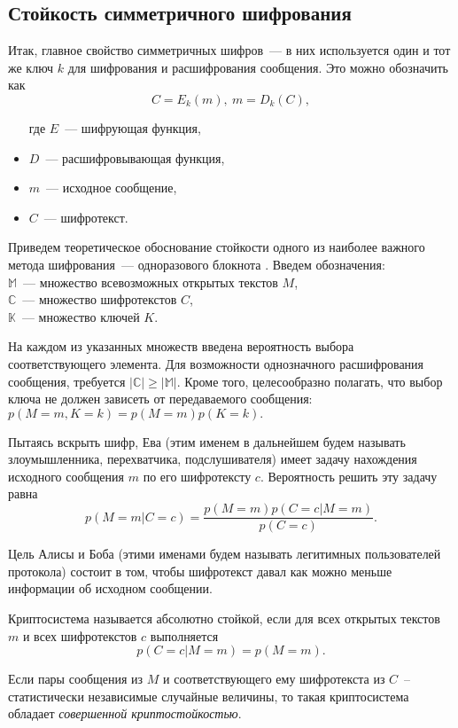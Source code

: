 \subsection{Стойкость симметричного шифрования}
Итак, главное свойство симметричных шифров~--- в них используется один и тот же ключ $k$ для шифрования и расшифрования сообщения.
Это можно обозначить как $$ C = E_k(m),\ m = D_k(C), $$
\begin{itemize}
  \item[где] $E$~--- шифрующая функция,
  \item $D$~--- расшифровывающая функция,
  \item $m$~--- исходное сообщение,
  \item $C$~--- шифротекст.
\end{itemize}

Приведем теоретическое обоснование стойкости одного из наиболее важного метода шифрования~--- одноразового блокнота \cite{vernam_cryptosystem}.
Введем обозначения: \\
$ \mathbb{M}$~--- множество всевозможных открытых текстов $M$, \\
$ \mathbb{C}$~--- множество шифротекстов $C$, \\
$ \mathbb{K}$~--- множество ключей $K$.

На каждом из указанных множеств введена вероятность выбора соответствующего элемента.
Для возможности однозначного расшифрования сообщения, требуется $|\mathbb{C}| \ge |\mathbb{M}|.$
Кроме того, целесообразно полагать, что выбор ключа не должен зависеть от передаваемого сообщения: $p(M = m, K = k) = p(M = m) p(K = k).$

Пытаясь вскрыть шифр, Ева (этим именем в дальнейшем будем называть злоумышленника, перехватчика, подслушивателя) имеет задачу нахождения исходного сообщения $m$ по его шифротексту $c$. Вероятность решить эту задачу равна
\begin{equation}
  p(M = m | C = c) = \frac{p(M = m) p(C = c|M = m)}{p(C = c)}.
\end{equation}
 
Цель Алисы и Боба (этими именами будем называть легитимных пользователей протокола) состоит в том, чтобы шифротекст давал как можно меньше информации об исходном сообщении.

\begin{definition}
  Криптосистема называется абсолютно стойкой, если для всех открытых текстов $m$ и всех шифротекстов $c$ выполняется
$$ p(C = c|M = m) = p(M = m). $$
\end{definition}
\begin{theorem}
Если пары сообщения из $M$ и соответствующего ему шифротекста из $C$~-- статистически независимые случайные величины, 
то такая криптосистема обладает \textit{совершенной криптостойкостью}.   
\end{theorem}

